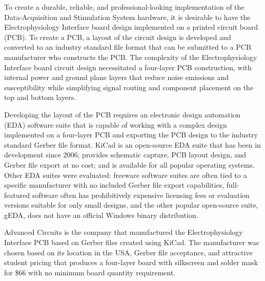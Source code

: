 To create a durable, reliable, and professional-looking implementation of the Data-Acquisition and Stimulation System hardware, it is desirable to have the Electrophysiology Interface board design implemented on a printed circuit board (PCB).  To create a PCB, a layout of the circuit design is developed and converted to an industry standard file format that can be submitted to a PCB manufacturer who constructs the PCB.  The complexity of the Electrophysiology Interface board circuit design necessitated a four-layer PCB construction, with internal power and ground plane layers that reduce noise emissions and susceptibility while simplifying signal routing and component placement on the top and bottom layers.

Developing the layout of the PCB requires an electronic design automation (EDA) software suite that is capable of working with a complex design implemented on a four-layer PCB and exporting the PCB design to the industry standard Gerber file format.  KiCad is an open-source EDA suite that has been in development since 2006; provides schematic capture, PCB layout design, and Gerber file export at no cost; and is available for all popular operating systems.  Other EDA suites were evaluated: freeware software suites are often tied to a specific manufacturer with no included Gerber file export capabilities, full-featured software often has prohibitively expensive licensing fees or evaluation versions suitable for only small designs, and the other popular open-source suite, gEDA, does not have an official Windows binary distribution. 

Advanced Circuits is the company that manufactured the Electrophysiology Interface PCB based on Gerber files created using KiCad.  The manufacturer was chosen based on its location in the USA, Gerber file acceptance, and attractive student pricing that produces a four-layer board with silkscreen and solder mask for \$66 with no minimum board quantity requirement.

